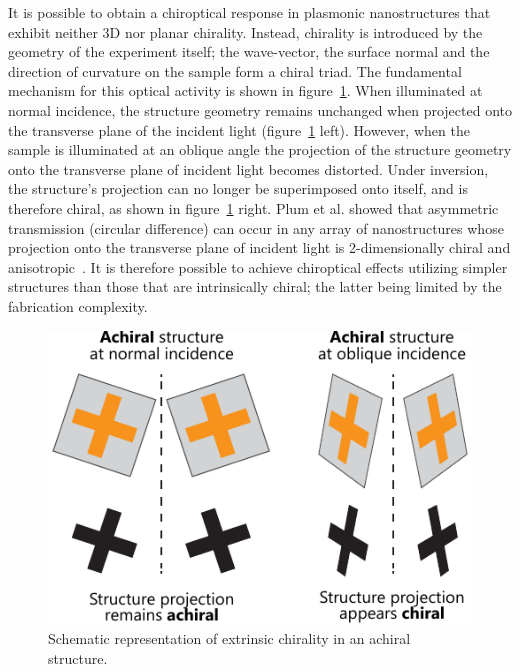 It is possible to obtain a chiroptical response in plasmonic nanostructures that exhibit neither 3D nor planar chirality. Instead, chirality is introduced by the geometry of the experiment itself; the wave-vector, the surface normal and the direction of curvature on the sample form a chiral triad. 
The fundamental mechanism for this optical activity is shown in figure~\ref{fig:background:Chirality:extrinsic}. When illuminated at normal incidence, the structure geometry remains unchanged when projected onto the transverse plane of the incident light (figure~\ref{fig:background:Chirality:extrinsic} left). However, when the sample is illuminated at an oblique angle the projection of the structure geometry onto the transverse plane of incident light becomes distorted. Under inversion, the structure's projection can no longer be superimposed onto itself, and is therefore chiral, as shown in figure~\ref{fig:background:Chirality:extrinsic} right. Plum et al. showed that asymmetric transmission (circular difference) can occur in any array of nanostructures whose projection onto the transverse plane of incident light is 2-dimensionally chiral and anisotropic~\cite{Plum2011}. It is therefore possible to achieve chiroptical effects utilizing simpler structures than those that are intrinsically chiral; the latter being limited by the fabrication complexity. 
\begin{figure}[htb!]
    \centering
    \includegraphics[scale=1.0]{./figures/background/chiroptics/extrinsic_chirality.pdf}
    \caption{\label{fig:background:Chirality:extrinsic}Schematic representation of extrinsic chirality in an achiral structure.}
\end{figure}

